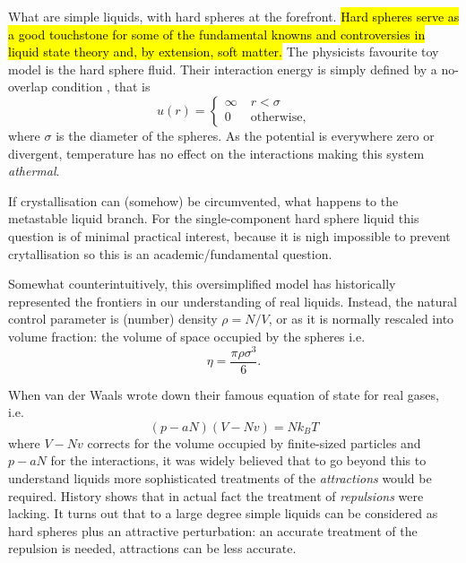 \documentclass[11pt,twoside]{report}
\begin{document}
What are simple liquids, with hard spheres at the forefront.
\hl{Hard spheres serve as a good touchstone for some of the fundamental knowns and controversies in liquid state theory and, by extension, soft matter.}
The physicists favourite toy model is the hard sphere fluid.
Their interaction energy is simply defined by a no-overlap condition%
,
that is
\begin{equation}\label{eq:hs-interaction}
  u(r) =
  \begin{cases}
    \infty & \; r < \sigma \\
    0 & \; \textrm{otherwise},
  \end{cases}
\end{equation}
where $\sigma$ is the diameter of the spheres.
As the potential is everywhere zero or divergent, temperature has no effect on the interactions making this system \emph{athermal}.

If crystallisation can (somehow) be circumvented, what happens to the metastable liquid branch.
For the single-component hard sphere liquid this question is of minimal practical interest, because it is nigh impossible to prevent crytallisation so this is an academic/fundamental question.

Somewhat counterintuitively, this oversimplified model has historically represented the frontiers in our understanding of real liquids.
Instead, the natural control parameter is (number) density $\rho = N/V$, or as it is normally rescaled into volume fraction: the volume of space occupied by the spheres i.e.\
\begin{equation}\label{eq:hs-volume-fraction}
  \eta
  =
  \frac{\pi \rho \sigma^3}{6}.
\end{equation}


When van der Waals wrote down their famous equation of state for real gases, i.e.\
\begin{equation}
  (p - a N)(V - Nv) = N k_B T
\end{equation}
where $V - Nv$ corrects for the volume occupied by finite-sized particles and $p - aN$ for the interactions,
it was widely believed that to go beyond this to understand liquids more sophisticated treatments of the \emph{attractions} would be required.
History shows that in actual fact the treatment of \emph{repulsions} were lacking.
It turns out that to a large degree simple liquids can be considered as hard spheres plus an attractive perturbation: an accurate treatment of the repulsion is needed, attractions can be less accurate.
\end{document}
